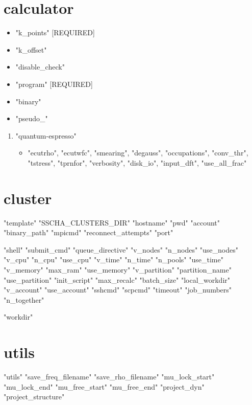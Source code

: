 \documentclass[]{scrartcl}
\begin{document}
\section{calculator}
\begin{itemize}
	\item "k\_points" [REQUIRED]
	\item "k\_offset"
	\item "disable\_check"
	\item "program" [REQUIRED]
	\item "binary"
	\item "pseudo\_"
\end{itemize}
\begin{enumerate}
	\item "quantum-espresso"
	\begin{itemize}
		\item "ecutrho", "ecutwfc", "smearing", "degauss", 
		"occupations", "conv\_thr", "tstress", "tprnfor",
		"verbosity", "disk\_io", "input\_dft", "use\_all\_frac"
	\end{itemize}
\end{enumerate}
\section{cluster}
"template"
"SSCHA\_CLUSTERS\_DIR"
"hostname"
"pwd"
"account"
"binary\_path"
"mpicmd"
"reconnect\_attempts"
"port"


"shell"
"submit\_cmd"
"queue\_directive"
"v\_nodes"
"n\_nodes"
"use\_nodes"
"v\_cpu"
"n\_cpu"
"use\_cpu"
"v\_time"
"n\_time"
"n\_pools"
"use\_time"
"v\_memory"
"max\_ram"
"use\_memory"
"v\_partition"
"partition\_name"
"use\_partition"
"init\_script"
"max\_recalc"
"batch\_size"
"local\_workdir"
"v\_account"
"use\_account"
"sshcmd"
"scpcmd"
"timeout"
"job\_numbers"
"n\_together"


"workdir"
\section{utils}
"utils"
"save\_freq\_filename"
"save\_rho\_filename"
"mu\_lock\_start"
"mu\_lock\_end"
"mu\_free\_start"
"mu\_free\_end"
"project\_dyn"
"project\_structure"
\end{document}
